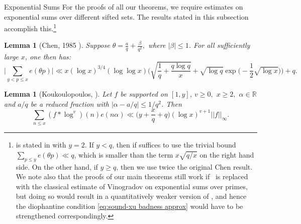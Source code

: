 \documentclass[12pt]{amsart}
\makeatletter
\renewcommand\subsection{\@startsection{subsection}{2}%
	\z@{1\linespacing\@plus1\linespacing}{\linespacing}%
	{\normalfont\bfseries\centering}}
\renewcommand{\le}{\leqslant}
\renewcommand{\leq}{\leqslant}
\renewcommand{\ge}{\geqslant}
\renewcommand{\geq}{\geqslant}
\numberwithin{equation}{section}
\theoremstyle{plain}
\newtheorem{lem}[thm]{Lemma}
\theoremstyle{definition}
\newcommand{\R}{\mathbb{R}}
\makeatother
\begin{document}
	\subsection{Exponential Sums}
	For the proofs of all our theorems, we require estimates on exponential sums over different sifted sets. The results stated in this subsection accomplish this.\footnote{ is stated in \cite{chen1985estimation_chinese} with $y=2$. If $y<q$, then if suffices to use the trivial bound $\sum_{p\le y} e(\theta p)\ll q$, which is smaller than the term $x\sqrt{q/x}$ on the right hand side. On the other hand, if $y\ge q$, then we use twice the original Chen result. We note also that the proofs of our main theorems still work if ~is replaced with the classical estimate of Vinogradov on exponential sums over primes, but doing so would result in a quantitatively weaker version of , and hence the diophantine condition \eqref{eq:sound-xu badness approx} would have to be strengthened correspondingly.}
	\begin{lem}[Chen, 1985 \cite{chen1985estimation_chinese}]\label{thm: exp sum primes}
		Suppose $\theta = \frac{a}{q} + \frac{\beta}{q^2},$ where $|\beta| \leq 1$. For all sufficiently large $x$, one then has:
		$$\bigg| \sum_{y < p \leq x}e(\theta p) \bigg| \ll x (\log x)^{3/4 } (\log \log x) \bigg( \sqrt{\frac{1}{q} + \frac{q \log q}{x}} + \sqrt{\log q} \exp \big(-\frac{1}{2} \sqrt{\log x}\big) \bigg) + q.$$
	\end{lem}
	
	\begin{lem}[{Koukoulopoulos, \cite[Theorem 23.5]{koukoulopoulos} }]\label{lem: dimitris exp sums}
		Let $f$ be supported on $[1,y]$, $v \geq 0,$  $x \geq 2,$ $\alpha \in \R$ and $a/q$ be a reduced fraction with $|\alpha -a/q| \leq 1/q^2$. Then 
		$$\sum_{n \leq x} (f * \log^v)(n) e(n \alpha) \ll \Big(y + \frac{x}{q} + q\Big)(\log x)^{v+1} ||f||_\infty.$$
	\end{lem}
	
\end{document}
